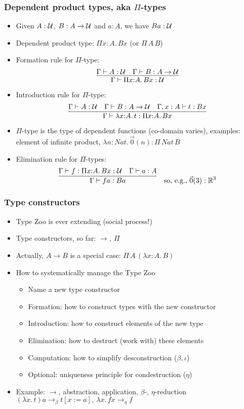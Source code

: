 \documentclass[handout]{beamer}
\newcommand{\depi}[3]{\Pi{#1{:}#2.\,#3}}
\newcommand{\lam}[2]{\lambda{#1.\,#2}}
\newcommand{\lamt}[3]{\lambda{#1{:}#2.\,#3}}
\newcommand{\Rea}{\mathbb{R}}
\newcommand{\UU}{{\cal U}}
\begin{document}
\frame
  {
  
    \frametitle{Dependent product types, aka $\Pi$-types}

    \begin{itemize}[<+->]
    \item Given $A:\UU$, $B : A\to \UU$ and $a:A$, we have $Ba:\UU$
    \item Dependent product type: $\depi{x}{A}{Bx}$ (or $\Pi\,{A}\,{B}$)
    \item Formation rule for $\Pi$-type:
\[\infer{\Gamma\vdash\depi{x}{A}{Bx}:\UU}{\Gamma\vdash A:\UU \quad \Gamma\vdash B : A\to \UU}\]
    \item Introduction rule for $\Pi$-type:
\[\infer{\Gamma\vdash\lamt{x}{A}{t}:\depi{x}{A}{Bx}}
        {\Gamma\vdash A:\UU\quad \Gamma\vdash B:A\to\UU\quad\Gamma,x:A \vdash t:Bx}\]
            \item $\Pi$-type is the type of dependent functions (co-domain varies), examples:
element of infinite product, $\lamt{n}{Nat}{\vec 0 (n)}: \Pi\,Nat\,B$
    \item Elimination rule for $\Pi$-types: 
\[\infer{\Gamma\vdash fa:Ba}{\Gamma\vdash f: \depi{x}{A}{Bx}:\UU \quad \Gamma\vdash a:A}
\quad \text{so, e.g., $\vec 0 (3) : \Rea^3$}
\]
    \end{itemize}
  }

\frame
  {
  
    \frametitle{Type constructors}

    \begin{itemize}[<+->]
    \item Type Zoo is ever extending (social process!) 
    \item Type constructors, so far: $\to,~\Pi$
    \item Actually, $A\to B$ is a special case: $\Pi\,A\,(\lamt{x}{A}{B})$
    \item How to systematically manage the Type Zoo
        \begin{itemize}[<+->]
        \item Name a new type constructor
        \item Formation: how to construct types with the new constructor
        \item Introduction: how to construct elements of the new type
        \item Elimination: how to destruct (work with) these elements
        \item Computation: how to simplify desconstruction ($\beta,\iota$)
        \item Optional: uniqueness principle for condestruction ($\eta$)
        \end{itemize}
    \item Example: $\to$, abstraction, application, $\beta$-, $\eta$-reduction
             $(\lam{x}{t})a \to_{\beta} t[x:=a],~\lam{x}{fx} \to_{\eta} f$
    \end{itemize}
  }
\end{document}
